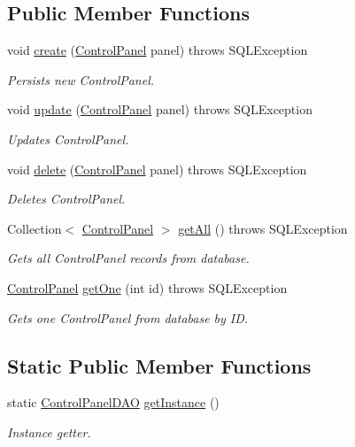 \subsection*{Public Member Functions}
\begin{DoxyCompactItemize}
\item 
void \hyperlink{classdatabase_1_1ControlPanelDAO_a26bf174c6843577170698637da59c42b}{create} (\hyperlink{classmodel_1_1ControlPanel}{Control\-Panel} panel)  throws S\-Q\-L\-Exception 
\begin{DoxyCompactList}\small\item\em Persists new Control\-Panel. \end{DoxyCompactList}\item 
void \hyperlink{classdatabase_1_1ControlPanelDAO_a32dd5b996d60643f82b8dcccfd80c189}{update} (\hyperlink{classmodel_1_1ControlPanel}{Control\-Panel} panel)  throws S\-Q\-L\-Exception 
\begin{DoxyCompactList}\small\item\em Updates Control\-Panel. \end{DoxyCompactList}\item 
void \hyperlink{classdatabase_1_1ControlPanelDAO_a1a4a1168f864952c013e3dfe19f2822e}{delete} (\hyperlink{classmodel_1_1ControlPanel}{Control\-Panel} panel)  throws S\-Q\-L\-Exception 
\begin{DoxyCompactList}\small\item\em Deletes Control\-Panel. \end{DoxyCompactList}\item 
Collection$<$ \hyperlink{classmodel_1_1ControlPanel}{Control\-Panel} $>$ \hyperlink{classdatabase_1_1ControlPanelDAO_a0eb46ac26e7539cd6a4c8053807e1e49}{get\-All} ()  throws S\-Q\-L\-Exception 
\begin{DoxyCompactList}\small\item\em Gets all Control\-Panel records from database. \end{DoxyCompactList}\item 
\hyperlink{classmodel_1_1ControlPanel}{Control\-Panel} \hyperlink{classdatabase_1_1ControlPanelDAO_ab7297ef5c4058a1e6a78928a451eed7f}{get\-One} (int id)  throws S\-Q\-L\-Exception 
\begin{DoxyCompactList}\small\item\em Gets one Control\-Panel from database by I\-D. \end{DoxyCompactList}\end{DoxyCompactItemize}
\subsection*{Static Public Member Functions}
\begin{DoxyCompactItemize}
\item 
static \hyperlink{classdatabase_1_1ControlPanelDAO}{Control\-Panel\-D\-A\-O} \hyperlink{classdatabase_1_1ControlPanelDAO_ae8576a0313a13f04339df4654d2f76af}{get\-Instance} ()
\begin{DoxyCompactList}\small\item\em Instance getter. \end{DoxyCompactList}\end{DoxyCompactItemize}
